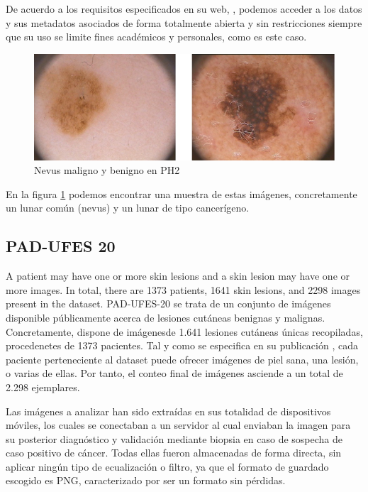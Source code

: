 De acuerdo a los requisitos especificados en su web, \cite{ph2data}, podemos acceder a los datos  y sus metadatos asociados de forma totalmente abierta y sin restricciones siempre que su uso se limite fines académicos y personales, como es este caso.
\begin{figure}[H]
	\centering
	\label {ph2}
	\includegraphics[scale = 0.6]{imagenes/PH2.png}
	\caption{Nevus maligno y benigno en PH2}
\end{figure}

En la figura \ref{ph2} podemos encontrar una muestra de estas imágenes, concretamente un lunar común (nevus) y un lunar de tipo cancerígeno.

\subsection{PAD-UFES 20}
A patient may have one or more skin lesions and a skin lesion may have one or more images. In total, there are 1373 patients, 1641 skin lesions, and 2298 images present in the dataset. 
PAD-UFES-20 \cite{PACHECO2020106221} se trata de un conjunto de imágenes disponible públicamente acerca de lesiones cutáneas benignas y malignas. Concretamente, dispone de imágenesde 1.641 lesiones cutáneas únicas recopiladas, procedenetes de 1373 pacientes. Tal y como se especifica en su publicación \cite{PACHECO2020106221}, cada paciente perteneciente al dataset puede ofrecer imágenes de piel sana, una lesión, o varias de ellas. Por tanto, el conteo final de imágenes asciende a un total de 2.298 ejemplares.

Las imágenes a analizar han sido extraídas en sus totalidad de dispositivos móviles, los cuales se conectaban a un servidor al cual enviaban la imagen para su posterior diagnóstico y validación mediante biopsia en caso de sospecha de caso positivo de cáncer. Todas ellas fueron almacenadas de forma directa, sin aplicar ningún tipo de ecualización o filtro, ya que el formato de guardado escogido es PNG, caracterizado por ser un formato sin pérdidas.

